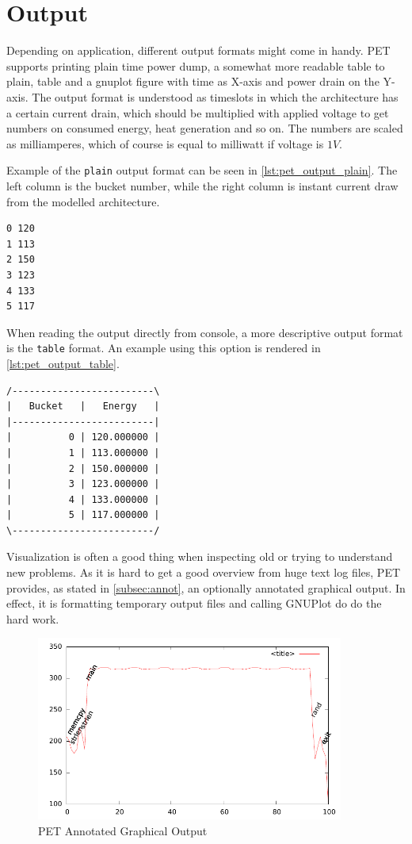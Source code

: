 \section{Output}
Depending on application, different output formats might come in handy. PET
supports printing plain time power dump, a somewhat more readable table to
plain, table and a gnuplot figure with time as X-axis and power drain on the
Y-axis. The output format is understood as timeslots in which the architecture
has a certain current drain, which should be multiplied with applied voltage to
get numbers on consumed energy, heat generation and so on. The numbers are
scaled as milliamperes, which of course is equal to milliwatt if voltage is
$1V$.

Example of the \texttt{plain} output format can be seen in
\autoref{lst:pet_output_plain}. The left column is the bucket number, while the
right column is instant current draw from the modelled architecture.

\begin{lstlisting}[label={lst:pet_output_plain},caption={PET Plain Output}]
0 120
1 113
2 150
3 123
4 133
5 117
\end{lstlisting}

When reading the output directly from console, a more descriptive output format
is the \texttt{table} format. An example using this option is rendered in
\autoref{lst:pet_output_table}.

\begin{lstlisting}[label={lst:pet_output_table},caption={PET Table Output}]
/-------------------------\
|   Bucket   |   Energy   |
|-------------------------|
|          0 | 120.000000 |
|          1 | 113.000000 |
|          2 | 150.000000 |
|          3 | 123.000000 |
|          4 | 133.000000 |
|          5 | 117.000000 |
\-------------------------/
\end{lstlisting}

Visualization is often a good thing when inspecting old or trying to understand
new problems. As it is hard to get a good overview from huge text log files, PET
provides, as stated in \autoref{subsec:annot}, an optionally annotated graphical
output. In effect, it is formatting temporary output files and calling GNUPlot
do do the hard work.

\begin{figure}
    \includegraphics[width=0.9\textwidth]{figs/annot.pdf}
    \caption{PET Annotated Graphical Output}
    \label{fig:annot}
\end{figure}

